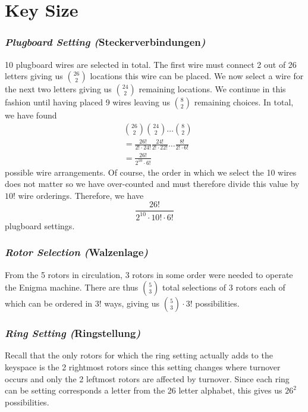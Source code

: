 \section{Key Size}

\subsubsection{\emph{Plugboard Setting (}Steckerverbindungen\emph{)}}
10 plugboard wires are selected in total. The first wire must connect
2 out of 26 letters giving us ${26\choose2}$ locations this wire can
be placed. We now select a wire for the next two letters giving us
${24\choose2}$ remaining locations. We continue in this fashion until
having placed 9 wires leaving us ${8\choose2}$ remaining choices. In
total, we have found
\begin{align*}
	 & {26\choose2}{24\choose2}\dots{8\choose2}                                  \\
	 & =\frac{26!}{2!\cdot 24!}\frac{24!}{2!\cdot 22!}\dots\frac{8!}{2!\cdot 6!} \\
	 & =\frac{26!}{2^{10}\cdot6!}
\end{align*}
possible wire arrangements. Of course, the order in which we select
the 10 wires does not matter so we have over-counted and must
therefore divide this value by $10!$ wire orderings. Therefore, we have
\[
	\frac{26!}{2^{10}\cdot 10! \cdot 6!}
\]
plugboard settings.

\subsubsection{\emph{Rotor Selection (}Walzenlage\emph{)}}
From the 5 rotors in circulation, 3 rotors in some order were needed
to operate the Enigma machine. There are thus ${5}\choose{3}$ total
selections of 3 rotors each of which can be ordered in $3!$ ways,
giving us ${5\choose3}\cdot{3!}$ possibilities.

\subsubsection{\emph{Ring Setting (}Ringstellung\emph{)}}
Recall that the only rotors for which the ring setting actually adds
to the keyspace is the 2 rightmost rotors since this setting changes
where turnover occurs and only the 2 leftmost rotors are affected by
turnover. Since each ring can be setting corresponds a letter from
the 26 letter alphabet, this gives us $26^2$ possibilities.

